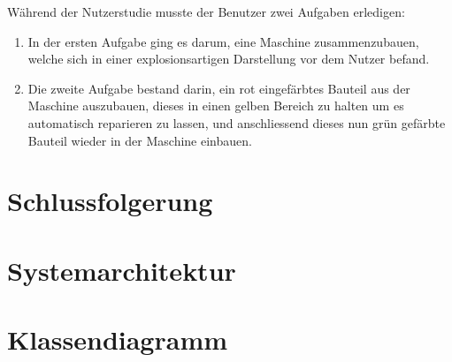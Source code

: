 \noindent Während der Nutzerstudie musste der Benutzer zwei Aufgaben erledigen:
\begin{enumerate}
	\item In der ersten Aufgabe ging es darum, eine Maschine zusammenzubauen, welche sich in einer explosionsartigen Darstellung vor dem Nutzer befand.
	
	
	\item Die zweite Aufgabe bestand darin, ein rot eingefärbtes Bauteil aus der Maschine auszubauen, dieses in einen gelben Bereich zu halten um es automatisch reparieren zu lassen, und anschliessend dieses nun grün gefärbte Bauteil wieder in der Maschine einbauen.
	
\end{enumerate}
\section{Schlussfolgerung}

\section{Systemarchitektur}

\section{Klassendiagramm}